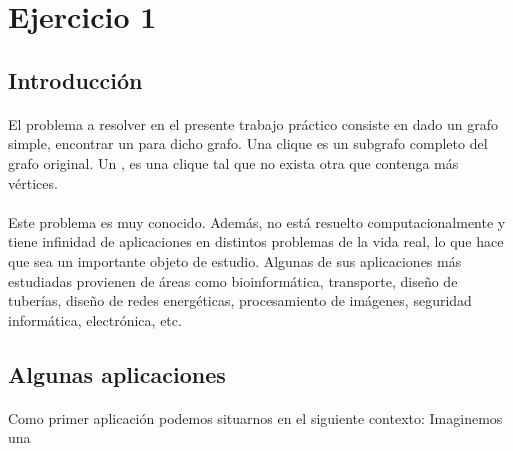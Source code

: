 \section{Ejercicio 1}
\subsection{Introducción}

\paragraph{}
El problema a resolver en el presente trabajo práctico consiste en dado un grafo simple, encontrar un \cm para dicho grafo. Una clique es un subgrafo completo del grafo original. Un \cm, es una clique tal que no exista otra que contenga más vértices.

\paragraph{}
Este problema es muy conocido. Además, no está resuelto computacionalmente y tiene infinidad de aplicaciones en distintos problemas de la vida real, lo que hace que sea un importante objeto de estudio. Algunas de sus aplicaciones más estudiadas provienen de áreas como bioinformática, transporte, diseño de tuberías, diseño de redes energéticas, procesamiento de imágenes, seguridad informática, electrónica, etc.

\subsection{Algunas aplicaciones}

\paragraph{}
Como primer aplicación podemos situarnos en el siguiente contexto: Imaginemos una




